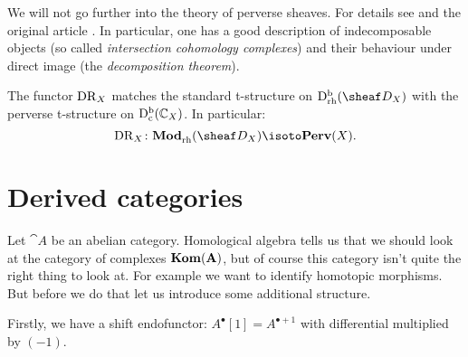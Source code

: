 \documentclass[number-in-sections,a4paper]{notes}
\begin{document}
We will not go further into the theory of perverse sheaves.
For details see \cite[Chapter~8]{HottaTakeuchiTanisaki:2008:DModulesPerverseSheavesRepresentationTheory} and the original article \cite{BBD}.
In particular, one has a good description of indecomposable objects (so called \emph{intersection cohomology complexes}) and their behaviour under direct image (the \emph{decomposition theorem}).

\begin{Theorem}
    The functor $\operatorname{DR}_X$ matches the standard t-structure on $\catDbDModrh{X}$ with the perverse t-structure on $\mathrm{D}^{\mathrm{b}}_{\mathrm{c}}({\mathbb{C}}_{X})$.
    In particular:
    \[
        \DR_X\colon \catDModrh{X} \isoto \catPerv{X}.
    \]
\end{Theorem}

\appendix

\section{Derived categories}
Let $\cat A$ be an abelian category.
Homological algebra tells us that we should look at the category of complexes $\mathbf{Kom}(\mathbf A)$, but of course this category isn't quite the right thing to look at.
For example we want to identify homotopic morphisms.
But before we do that let us introduce some additional structure.

Firstly, we have a shift endofunctor: $A^\bullet[1] = A^{\bullet + 1}$ with differential multiplied by $(-1)$.
\end{document}
